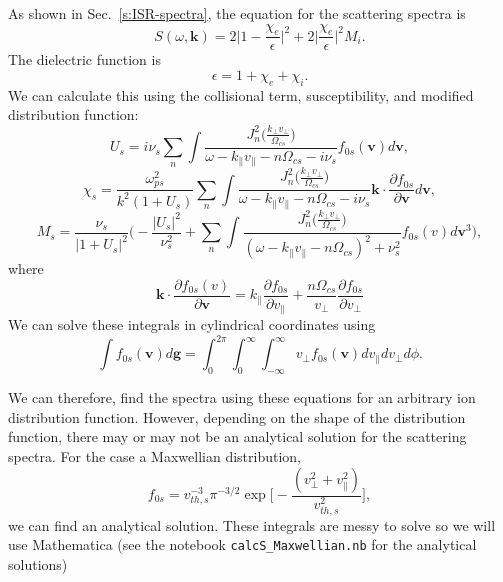 As shown in Sec.~\ref{s:ISR-spectra}, the equation for the scattering spectra is
\begin{equation}
	S(\omega,\mathbf{k}) = 2 \Big| 1 - \frac{\chi_e}{\epsilon}\Big|^2
	+ 2\Big|\frac{\chi_e}{\epsilon}\Big|^2 M_i.
\end{equation}
The dielectric function is
\begin{equation}
	\epsilon = 1 + \chi_e + \chi_i.
\end{equation}
We can calculate this using the collisional term, susceptibility, and modified distribution function:
\begin{equation}
	U_s = i\nu_s \sum_n \int
	\frac{J_n^2\Big( \tfrac{k_\perp v_\perp}{\Omega_{cs}} \Big)}
	{\omega-k_\parallel v_\parallel - n\Omega_{cs} - i\nu_s}
	f_{0s}(\mathbf{v}) d\mathbf{v} ,
\end{equation}
\begin{equation}
	\chi_s = \frac{\omega_{ps}^2}{k^2(1+U_s)}
	\sum_n \int
	\frac{J_n^2 \Big( \tfrac{k_\perp v_\perp}{\Omega_{cs}} \Big)}
	{\omega-k_\parallel v_\parallel - n\Omega_{cs} - i\nu_s}
	\mathbf{k} \cdot \frac{\partial f_{0s}}{\partial \mathbf{v}} d\mathbf{v},
\end{equation}
\begin{equation}
	M_s = \frac{\nu_s}{|1+U_s|^2}
	\Bigg( - \frac{|U_s|^2}{\nu_s^2} 
	+ \sum_n \int 
	\frac{J_n^2\Big( \tfrac{k_\perp v_\perp}{\Omega_{cs}} \Big)}
	{(\omega - k_\parallel v_\parallel - n\Omega_{cs})^2 + \nu_s^2}
	f_{0s}(v)   d\mathbf{v}^3 \Bigg),
\end{equation}
where 
\begin{equation}
	\mathbf{k} \cdot \frac{\partial f_{0s}(v) }{\partial \mathbf{v}} = 
		k_\parallel \frac{\partial f_{0s}}{\partial v_\parallel}
		+ \frac{n \Omega_{cs}}{v_\perp} \frac{\partial f_{0s}}{\partial v_\perp}
\end{equation}
We can solve these integrals in cylindrical coordinates using 
\begin{equation}
	\int f_{0s}(\mathbf{v}) d\mathbf{g} = \int_0^{2\pi} \int_0^\infty \int_{-\infty}^\infty v_\perp f_{0s}(\mathbf{v}) 
	dv_\parallel dv_\perp d\phi.
\end{equation}

We can therefore, find the spectra using these equations
for an arbitrary ion distribution function.
However, depending on the shape of the distribution function, there may or may not be an
analytical solution for the scattering spectra.
For the case a Maxwellian distribution, 
\begin{equation}
	f_{0s} = v_{th,s}^{-3} \pi^{-3/2} \exp\bigg[ - \frac{(v_\perp^2 + v_\parallel^2)}{v_{th,s}^2} \bigg],
\end{equation}
we can find an analytical solution.
These integrals are messy to solve so we will use Mathematica (see the notebook \verb|calcS_Maxwellian.nb| for the analytical solutions)

